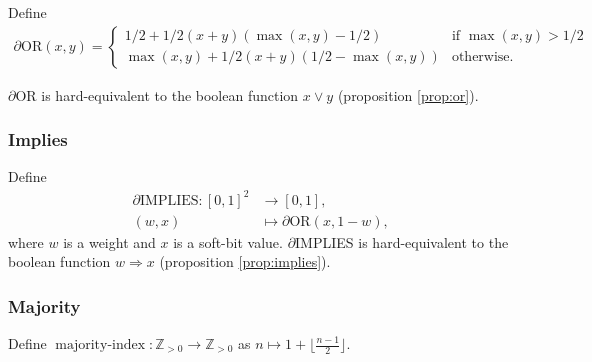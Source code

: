 \documentclass{article} %
\begin{document}
Define 
\begin{equation*}
\begin{aligned}
\partial\text{OR}(x, y) =
\begin{cases}
1/2 + 1/2(x + y)(\operatorname{max}(x,y) - 1/2) & \text{if } \operatorname{max}(x,y) > 1/2 \\
\operatorname{max}(x,y) + 1/2(x + y)(1/2 - \operatorname{max}(x,y)) & \text{otherwise.}
\end{cases}
\end{aligned}
\end{equation*}

$\partial${OR} is hard-equivalent to the boolean function $x \vee y$ (proposition \ref{prop:or}).

\subsubsection{Implies}

Define
\begin{equation*}
\begin{aligned}
\partial\text{IMPLIES}: [0,1]^{2} &\to [0,1],\\
(w, x) &\mapsto \partial\text{OR}(x, 1-w)\text{,}
\end{aligned}
\end{equation*}
where $w$ is a weight and $x$ is a soft-bit value.
$\partial${IMPLIES} is hard-equivalent to the boolean function $w \Rightarrow x$ (proposition \ref{prop:implies}).

\subsubsection{Majority}

Define $\operatorname{majority-index}: \mathbb{Z}_{>0} \to \mathbb{Z}_{> 0}$ as $n \mapsto 1 + \lfloor \frac{n-1}{2}\rfloor$. 
\end{document}
